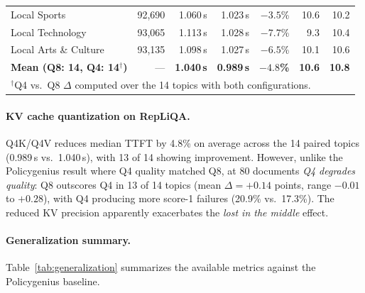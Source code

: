 \documentclass{article}
\begin{document}
\begin{table}[t]
\begin{tabular}{lrrrrrr}
Local Sports            & 92,690  & 1.060\,s & 1.023\,s & $-3.5$\% & 10.6 & 10.2 \\
Local Technology        & 93,065  & 1.113\,s & 1.028\,s & $-7.7$\% & 9.3  & 10.4 \\
Local Arts \& Culture   & 93,135  & 1.098\,s & 1.027\,s & $-6.5$\% & 10.1 & 10.6 \\
\midrule
\textbf{Mean (Q8: 14, Q4: 14$^\dagger$)} & --- & \textbf{1.040\,s} & \textbf{0.989\,s} & \textbf{$-4.8$\%} & \textbf{10.6} & \textbf{10.8} \\
\bottomrule
\multicolumn{7}{l}{\footnotesize $^\dagger$Q4 vs.\ Q8 $\Delta$ computed over the 14 topics with both configurations.}
\end{tabular}
\end{table}

\paragraph{KV cache quantization on RepLiQA.}
Q4K/Q4V reduces median TTFT by 4.8\% on average across the 14 paired
topics (0.989\,s vs.\ 1.040\,s), with 13 of 14 showing improvement.
However, unlike the Policygenius result where Q4 quality matched Q8,
at 80 documents \emph{Q4 degrades quality}: Q8 outscores Q4 in 13 of 14
topics (mean $\Delta = +0.14$ points, range $-0.01$ to $+0.28$), with
Q4 producing more score-1 failures (20.9\% vs.\ 17.3\%). The reduced
KV precision apparently exacerbates the \emph{lost in the middle} effect.

\paragraph{Generalization summary.}
Table~\ref{tab:generalization} summarizes the available metrics against
the Policygenius baseline.
\end{document}
